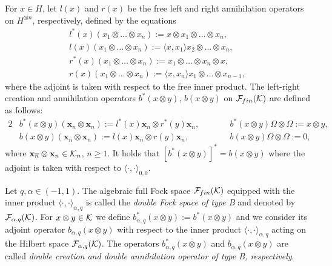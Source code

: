 \documentclass[11pt]{article}
\numberwithin{equation}{section}
\numberwithin{equation}{section}
\def\B{b_{\s,\q}}
\def\r{b}
\def\F{\mathcal{F}_{\rm fin}(\HH)}
\def\H{{\bf \mathcal K}_{ n}}
\def\HH{{\bf \mathcal K}}
\newcommand{\q}{q}
\newcommand{\s}{\alpha}%
\newcommand{\x}{\mathbf{x}_{\overline n} \otimes \mathbf{x}_n}
\begin{document}
For $x\in H$, let $l(x)$ and $r(x)$ be the free left and right
annihilation operators on $H^{\otimes n} $, respectively, defined by
the equations
\begin{gather*}
l^\ast(x)(x_1\otimes \dots \otimes x_n ):=x\otimes x_1\otimes \dots \otimes x_n ,
\\
l(x)(x_1\otimes \dots \otimes x_n ):=\langle x, x_1 \rangle x_2\otimes \dots \otimes x_n ,
\\
r^\ast(x)(x_1\otimes \dots \otimes x_n ):= x_1\otimes \dots \otimes x_n \otimes x,
\\
r(x)(x_1\otimes \dots \otimes x_n ):=\langle x, x_n \rangle x_1\otimes \dots \otimes x_{n-1},
\end{gather*}
where the adjoint is taken with respect to the free inner product.
The left-right creation and annihilation operators $\r^\ast(x\otimes y)$, $\r(x\otimes y)$ on $\F$ are defined as follows:
\begin{alignat*}{2}
&\r^\ast(x\otimes y)(\x):=l^\ast(x)\mathbf{x}_{\overline n}\otimes
	r^\ast( y) \mathbf{x}_n, \qquad &&\r^\ast(x\otimes y)\Omega \otimes \Omega:=x \otimes y,
\\
&\r(x\otimes y)(\x ):= l( x) \mathbf{x}_{\overline n}\otimes r(y)\mathbf{x}_n , \qquad &&\r(x\otimes y)\Omega \otimes \Omega :=0,
\end{alignat*}
where $\x\in \H$, $n\geq 1$.
It holds that $[\r^\ast(x\otimes y)]^\ast = \r(x\otimes y)$ where the adjoint is taken with respect to $\langle \cdot, \cdot \rangle_{0,0}$.

\begin{Definition} Let $\q,\s \in (-1,1)$. The algebraic full Fock space $\F$ equipped with the inner product $\langle\cdot,\cdot \rangle_{\s,\q}$ is called the \emph{double Fock space of type B} and denoted by $\mathcal{F}_{\s,\q}(\HH)$.
	For $x\otimes y \in \HH$ we define $\B^\ast(x\otimes y):=
	\r^\ast(x\otimes y)$ and we consider its adjoint operator $\B(x\otimes
	y)$ with
	respect to the inner product $\langle\cdot,\cdot \rangle_{\s,\q}$
	acting on the Hilbert space $\mathcal{F}_{\s,\q}(\HH)$. The operators $\B^\ast(x\otimes y)$ and $\B(x\otimes y)$ are called \emph{double creation and double annihilation operator of type B, respectively}.
\end{Definition}
\end{document}

